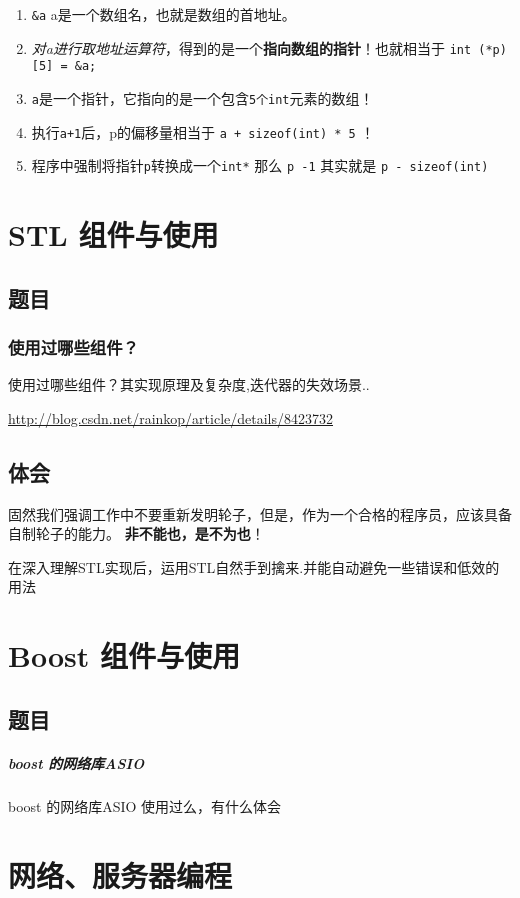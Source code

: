 \documentclass[UTF8,a4paper,8pt]{ctexart}
\begin{document}
		\begin{enumerate}
			\item \verb|&a|   a是一个数组名，也就是数组的首地址。
			\item \textit{对a进行取地址运算符}，得到的是一个\textbf{指向数组的指针}！也就相当于 \verb|int (*p) [5] = &a;|
			\item \verb|a|是一个指针，它指向的是一个包含\verb|5个int|元素的数组！
			\item 执行\verb|a+1|后，p的偏移量相当于 \verb|a + sizeof(int) * 5| ！
			\item 程序中强制将指针\verb|p|转换成一个\verb|int*| 那么 \verb|p -1| 其实就是 \verb|p - sizeof(int)|
		\end{enumerate}
\newpage
\section{STL 组件与使用}
	\subsection{题目}
		\subsubsection{使用过哪些组件？} 使用过哪些组件？其实现原理及复杂度,迭代器的失效场景..
		
		\url{http://blog.csdn.net/rainkop/article/details/8423732}

	\subsection{体会}
		固然我们强调工作中不要重新发明轮子，但是，作为一个合格的程序员，应该具备自制轮子的能力。
		\textbf{非不能也，是不为也}！
		
		在深入理解STL实现后，运用STL自然手到擒来.并能自动避免一些错误和低效的用法
		
		
\newpage
\section{Boost 组件与使用}
	\subsection{题目}
		\subparagraph{boost 的网络库ASIO}  boost 的网络库ASIO 使用过么，有什么体会
		

\newpage
\section{网络、服务器编程}
\end{document}
